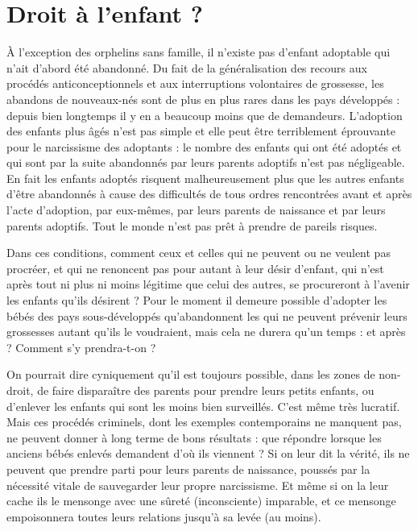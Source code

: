 
\chapter{Droit à l'enfant ?}


 À l'exception des orphelins sans famille, il n'existe pas d'enfant adoptable qui n'ait d'abord été abandonné. Du fait de la généralisation des recours aux procédés anticonceptionnels et aux interruptions volontaires de grossesse, les abandons de nouveaux-nés sont de plus en plus rares dans les pays développés : depuis bien longtemps il y en a beaucoup moins que de demandeurs. L'adoption des enfants plus âgés n'est pas simple et elle peut être terriblement éprouvante pour le narcissisme des adoptants : le nombre des enfants qui ont été adoptés et qui sont par la suite abandonnés par leurs parents adoptifs n'est pas négligeable. En fait les enfants adoptés risquent malheureusement plus que les autres enfants d'être abandonnés à cause des difficultés de tous ordres rencontrées avant et après l'acte d'adoption, par eux-mêmes, par leurs parents de naissance et par leurs parents adoptifs. Tout le monde n'est pas prêt à prendre de pareils risques.

 Dans ces conditions, comment ceux et celles qui ne peuvent ou ne veulent pas procréer, et qui ne renoncent pas pour autant à leur désir d'enfant, qui n'est après tout ni plus ni moins légitime que celui des autres, se procureront à l'avenir les enfants qu'ils désirent ? Pour le moment il demeure possible d'adopter les bébés des pays sous-développés qu'abandonnent les  qui ne peuvent prévenir leurs grossesses autant qu'ils le voudraient, mais cela ne durera qu'un temps : et après ? Comment s'y prendra-t-on ?

 On pourrait dire cyniquement qu'il est toujours possible, dans les zones de non-droit, de faire disparaître des parents pour prendre leurs petits enfants, ou d'enlever les enfants qui sont les moins bien surveillés. C'est même très lucratif. Mais ces procédés criminels, dont les exemples contemporains ne manquent pas, ne peuvent donner à long terme de bons résultats : que répondre lorsque les anciens bébés enlevés demandent d'où ils viennent ? Si on leur dit la vérité, ils ne peuvent que prendre parti pour leurs parents de naissance, poussés  par la nécessité vitale de sauvegarder leur propre narcissisme. Et même si on la leur cache ils  le mensonge avec une sûreté (inconsciente) imparable, et ce mensonge empoisonnera toutes leurs relations jusqu'à sa levée (au moins).

